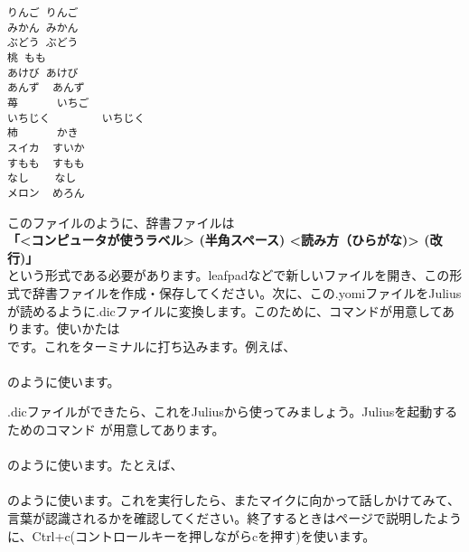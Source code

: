 \begin{lstlisting}[caption=kudamino.yomi,label=kudamino.yomi]
りんご りんご
みかん みかん
ぶどう ぶどう
桃 もも
あけび あけび
あんず  あんず
苺      いちご
いちじく        いちじく
柿      かき
スイカ  すいか
すもも  すもも
なし    なし
メロン  めろん
\end{lstlisting}

このファイルのように、辞書ファイルは\\
\textbf{「<コンピュータが使うラベル> (半角スペース) <読み方（ひらがな)> (改行)」}\\
という形式である必要があります。leafpadなどで新しいファイルを開き、この形式で辞書ファイルを作成・保存してください。次に、この.yomiファイルをJuliusが読めるように.dicファイルに変換します。このために、コマンドが用意してあります。使いかたは\\
です。これをターミナルに打ち込みます。例えば、\\
\\
のように使います。

.dicファイルができたら、これをJuliusから使ってみましょう。Juliusを起動するためのコマンド  が用意してあります。\\
\\
のように使います。たとえば、\\
\\
のように使います。これを実行したら、またマイクに向かって話しかけてみて、言葉が認識されるかを確認してください。終了するときは\pageref{Julius}ページで説明したように、Ctrl+c(コントロールキーを押しながらcを押す)を使います。

\begin{tcolorbox}[title=\useOmetoi]
\begin{enumerate}
\end{enumerate}
\end{tcolorbox}
